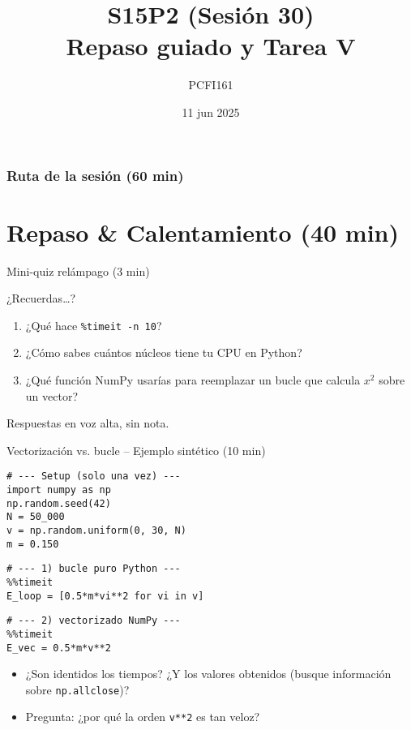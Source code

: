 \documentclass[10pt]{beamer}
\title{S15P2 (Sesión 30)\\Repaso guiado y Tarea V}
\author{PCFI161}
\date{11 jun 2025}
\begin{document}
\myfront{}

\begin{frame}
  \titlepage
\end{frame}

\begin{frame}
  \frametitle{Ruta de la sesión (60 min)}
  \tableofcontents
\end{frame}


\section{Repaso \& Calentamiento (40 min)}

\begin{frame}{Mini-quiz relámpago (3 min)}
\begin{block}{¿Recuerdas…?}
\begin{enumerate}
  \item ¿Qué hace \texttt{\%timeit -n 10}?
  \item ¿Cómo sabes cuántos núcleos tiene tu CPU en Python?
  \item ¿Qué función NumPy usarías para reemplazar un bucle que calcula $x^2$ sobre un vector?
\end{enumerate}
\end{block}
{\scriptsize Respuestas en voz alta, sin nota.}
\end{frame}

\begin{frame}[fragile]{Vectorización vs. bucle – Ejemplo sintético (10 min)}
\vspace{-0.3cm}
\begin{verbatim}
# --- Setup (solo una vez) ---
import numpy as np
np.random.seed(42)
N = 50_000
v = np.random.uniform(0, 30, N)
m = 0.150
\end{verbatim}
\vspace{-0.3cm}
\begin{verbatim}
# --- 1) bucle puro Python ---
%%timeit
E_loop = [0.5*m*vi**2 for vi in v]
\end{verbatim}
\vspace{-0.3cm}
\begin{verbatim}
# --- 2) vectorizado NumPy ---
%%timeit
E_vec = 0.5*m*v**2
\end{verbatim}

\begin{itemize}\small
  \item ¿Son identidos los tiempos? ¿Y los valores obtenidos (busque información sobre \texttt{np.allclose})? 
  \item Pregunta: ¿por qué la orden \texttt{v**2} es tan veloz?
\end{itemize}
\end{frame}
\end{document}

